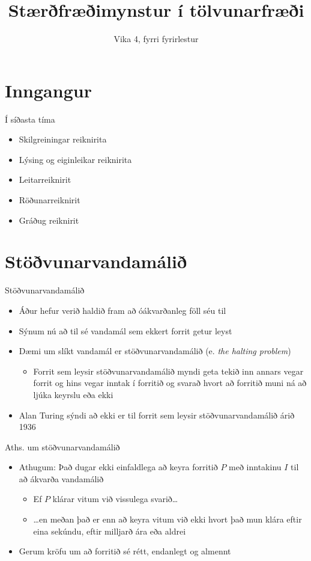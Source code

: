\documentclass{beamer}
\title{Stærðfræðimynstur í tölvunarfræði}
\subtitle{Vika 4, fyrri fyrirlestur}
\begin{document}
\begin{frame}
\titlepage
\end{frame}

\section{Inngangur}

\begin{frame}{Í síðasta tíma}
\begin{itemize}
 \item Skilgreiningar reiknirita
 \item Lýsing og eiginleikar reiknirita
 \item Leitarreiknirit
 \item Röðunarreiknirit
 \item Gráðug reiknirit
\end{itemize}
\end{frame}


\section{Stöðvunarvandamálið}

\begin{frame}{Stöðvunarvandamálið}
\begin{itemize}
 \item Áður hefur verið haldið fram að óákvarðanleg föll séu til
 \item Sýnum nú að til sé vandamál sem ekkert forrit getur leyst
 \item Dæmi um slíkt vandamál er stöðvunarvandamálið (e. \emph{the halting problem})
 \begin{itemize}
  \item Forrit sem leysir stöðvunarvandamálið myndi geta tekið inn annars vegar forrit og hins vegar inntak í forritið og svarað hvort að forritið muni ná að ljúka keyrslu eða ekki 
 \end{itemize}
 \item Alan Turing sýndi að ekki er til forrit sem leysir stöðvunarvandamálið árið 1936
\end{itemize}
\end{frame}

\begin{frame}{Aths. um stöðvunarvandamálið}
    \begin{itemize}
    \item Athugum: Það dugar ekki einfaldlega að keyra forritið $P$ með inntakinu $I$ til að ákvarða vandamálið
    \begin{itemize}
    \item Ef $P$ klárar vitum við vissulega svarið\ldots
    \item \ldots en meðan það er enn að keyra vitum við ekki hvort það mun klára eftir eina sekúndu, eftir milljarð ára eða aldrei
    \end{itemize}
    \item Gerum kröfu um að forritið sé rétt, endanlegt og almennt
    \end{itemize}
\end{frame}
\end{document}
